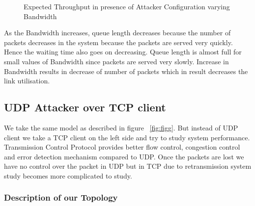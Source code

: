 \begin{figure}[H]
		\centering
		\caption{{Expected Throughput in presence of Attacker Configuration varying Bandwidth}}
		\label{fig:figdf}
\end{figure}

As the Bandwidth increases, queue length decreases because the number of packets decreases in the system because the packets are served very quickly. Hence the waiting time also goes on decreasing. Queue length is almost full for small values of Bandwidth since packets are served very slowly. Increase in Bandwidth results in decrease of number of packets which in result decreases the link utilisation. 

\pagebreak

\subsection{UDP Attacker over TCP client}

We take the same model as described in figure ~\ref{fig:figg}. But instead of UDP client we take a TCP client on the left side and try to study system performance. Transmission Control Protocol provides better flow control, congestion control and error detection mechanism compared to UDP. Once the packets are lost we have no control over the packet in UDP but in TCP due to retransmission 
system study becomes more complicated to study. 

\subsubsection{Description of our Topology} 

